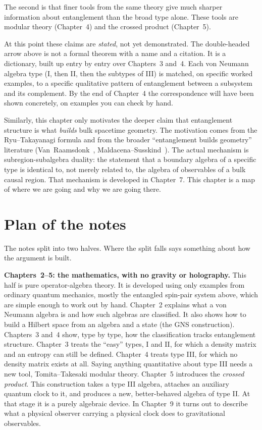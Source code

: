 The second is that finer tools from the same theory give much sharper information about entanglement than the
broad type alone. These tools are modular theory (Chapter~4) and the crossed product (Chapter~5).

At this point these claims are \emph{stated}, not yet demonstrated. The double-headed arrow above is not a
formal theorem with a name and a citation. It is a dictionary, built up entry by entry over Chapters~3
and~4. Each von Neumann algebra type (I, then II, then the subtypes of III) is matched, on specific worked
examples, to a specific qualitative pattern of entanglement between a subsystem and its complement. By the
end of Chapter~4 the correspondence will have been shown concretely, on examples you can check by hand.

Similarly, this chapter only motivates the deeper claim that entanglement structure is what \emph{builds}
bulk spacetime geometry. The motivation comes from the Ryu--Takayanagi formula and from the broader
``entanglement builds geometry'' literature (Van~Raamsdonk~\cite{VanRaamsdonk},
Maldacena--Susskind~\cite{MaldacenaSusskind}). The actual mechanism is subregion-subalgebra duality: the
statement that a boundary algebra of a specific type is identical to, not merely related to, the algebra of
observables of a bulk causal region. That mechanism is developed in Chapter~7. This chapter is a map of where
we are going and why we are going there.

\section{Plan of the notes}

The notes split into two halves. Where the split falls says something about how the argument is built.

\textbf{Chapters~2--5: the mathematics, with no gravity or holography.} This half is pure operator-algebra
theory. It is developed using only examples from ordinary quantum mechanics, mostly the entangled spin-pair
system above, which are simple enough to work out by hand. Chapter~2 explains what a von Neumann algebra is
and how such algebras are classified. It also shows how to build a Hilbert space from an algebra and a state
(the GNS construction). Chapters~3 and~4 show, type by type, how the classification tracks entanglement
structure. Chapter~3 treats the ``easy'' types, I and II, for which a density matrix and an entropy can still
be defined. Chapter~4 treats type III, for which no density matrix exists at all. Saying anything quantitative
about type III needs a new tool, Tomita--Takesaki modular theory. Chapter~5 introduces the \emph{crossed
product}. This construction takes a type III algebra, attaches an auxiliary quantum clock to it, and produces
a new, better-behaved algebra of type II. At that stage it is a purely algebraic device. In Chapter~9 it turns
out to describe what a physical observer carrying a physical clock does to gravitational observables.

